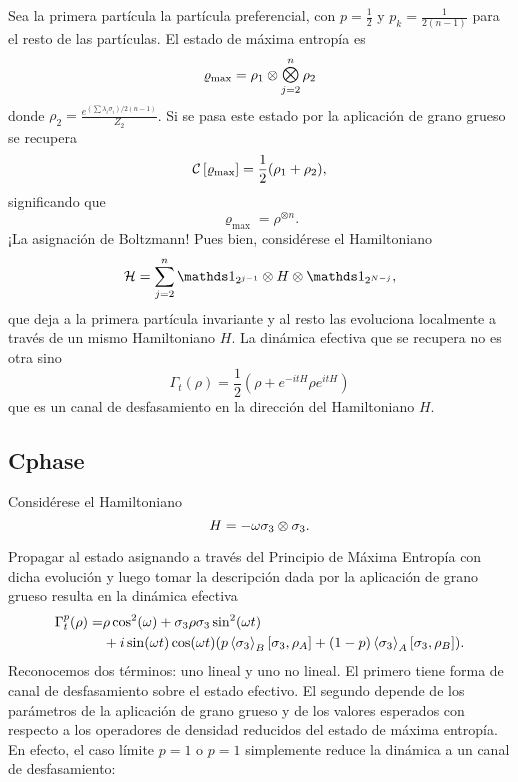 Sea la primera partícula la partícula preferencial, con $p=\frac{1}{2}$ y $p_{k}=\frac{1}{2(n-1)}$ para el resto de las partículas. El estado de máxima entropía es
\begin{equation*}
    \varrho_{\max}=\rho_{1}\otimes\Motimes_{j=2}^{n}\rho_{2}
\end{equation*}
donde $\rho_{2}=\frac{e^{(\sum \lambda_{i}\sigma_{i})/2(n-1)}}{Z_{2}}$. Si se pasa este estado por la aplicación de grano grueso se recupera
\begin{equation*}
    \mathcal{C}\left[\varrho_{\max}\right]=\frac{1}{2}(\rho_{1}+\rho_{2}),
\end{equation*}
significando que 
\begin{equation*}
    \varrho_{\max}=\rho^{\otimes n}.
\end{equation*}
¡La asignación de Boltzmann! Pues bien, considérese el Hamiltoniano
\begin{equation*}
    \mcH=\sum_{j=2}^{n}\Id_{2^{j-1}}\otimes H \otimes \Id_{2^{N-j}},
\end{equation*}
que deja a la primera partícula invariante y al resto las evoluciona localmente a través de un mismo Hamiltoniano $H$. La dinámica efectiva que se recupera no es otra sino
\begin{equation*}
    \Gamma_{t}(\rho)=\frac{1}{2}(\rho+e^{-itH}\rho e^{itH})
\end{equation*}
que es un canal de desfasamiento en la dirección del Hamiltoniano $H$.

\subsection{Cphase}

Considérese el Hamiltoniano
\begin{equation*}
    H=-\omega \sigma_{3}\otimes\sigma_{3}.
\end{equation*}

Propagar al estado asignando a través del Principio de Máxima Entropía con dicha evolución y luego tomar la descripción dada por la aplicación de grano grueso resulta en la dinámica efectiva
\begin{align*}
    \Gamma_{t}^{p}(\rho)=&\rho \cos^{2}(\omega)+\sigma_{3} \rho \sigma_{3} \sin^{2}(\omega t)\\
    & + i\sin(\omega t)\cos(\omega t)\qty(p\expval{\sigma_{3}}_{B}[\sigma_{3},\rho_{A}]+(1-p)\expval{\sigma_{3}}_{A}[\sigma_{3},\rho_{B}]).
\end{align*}
Reconocemos dos términos: uno lineal y uno no lineal. El primero tiene forma de canal de desfasamiento sobre el estado efectivo. El segundo depende de los parámetros de la aplicación de grano grueso y de los valores esperados con respecto a los operadores de densidad reducidos del estado de máxima entropía. En efecto, el caso límite $p=1$ o $p=1$ simplemente reduce la dinámica a un canal de desfasamiento:

